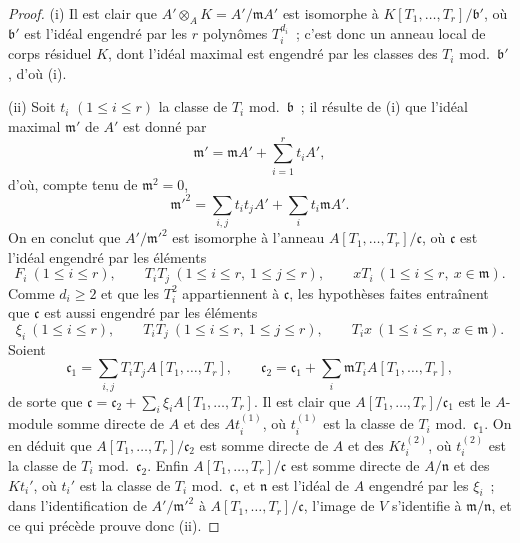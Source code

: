 \begin{proof}
(i) Il est clair que $A'\otimes_AK=A'/\mathfrak mA'$ est isomorphe à
$K[T_1,\ldots,T_r]/\mathfrak b'$, où $\mathfrak b'$ est l'idéal engendré
par les $r$ polynômes $T_i^{d_i}$~; c'est donc un anneau local de corps
résiduel $K$, dont l'idéal maximal est engendré par les classes des $T_i$
mod.~$\mathfrak b'$, d'où (i).

(ii) Soit $t_i$ $(1\leqslant i\leqslant r)$ la classe de $T_i$
mod.~$\mathfrak b$~; il résulte de (i) que l'idéal maximal $\mathfrak m'$ de
$A'$ est donné par
\[
  \mathfrak m'=\mathfrak mA'+\sum_{i=1}^r t_iA',
\]
d'où, compte tenu de $\mathfrak m^2=0$,
\[
  \mathfrak m'^2=\sum_{i,j}t_it_jA'+\sum_i t_i\mathfrak mA'.
\]
On en conclut que $A'/\mathfrak m'^2$ est isomorphe à l'anneau
$A[T_1,\ldots,T_r]/\mathfrak c$, où $\mathfrak c$ est l'idéal engendré par
les éléments
\[
  F_i\ (1\leqslant i\leqslant r),\qquad
  T_iT_j\ (1\leqslant i\leqslant r,\ 1\leqslant j\leqslant r),\qquad
  xT_i\ (1\leqslant i\leqslant r,\ x\in\mathfrak m).
\]
Comme $d_i\geqslant2$ et que les $T_i^2$ appartiennent à
$\mathfrak c$, les hypothèses faites entraînent que $\mathfrak c$ est aussi
engendré par les éléments
\[
  \xi_i\ (1\leqslant i\leqslant r),\qquad
  T_iT_j\ (1\leqslant i\leqslant r,\ 1\leqslant j\leqslant r),\qquad
  T_ix\ (1\leqslant i\leqslant r,\ x\in\mathfrak m).
\]
Soient
\[
  \mathfrak c_1=\sum_{i,j}T_iT_jA[T_1,\ldots,T_r],\qquad
  \mathfrak c_2=\mathfrak c_1+\sum_i\mathfrak mT_iA[T_1,\ldots,T_r],
\]
de sorte que
$\mathfrak c=\mathfrak c_2+\sum_i\xi_iA[T_1,\ldots,T_r]$. Il est clair que
$A[T_1,\ldots,T_r]/\mathfrak c_1$ est le $A$-module somme directe de $A$ et
des $At_i^{(1)}$, où $t_i^{(1)}$ est la classe de $T_i$
mod.~$\mathfrak c_1$. On en déduit que
$A[T_1,\ldots,T_r]/\mathfrak c_2$ est somme directe de $A$ et des
$Kt_i^{(2)}$, où $t_i^{(2)}$ est la classe de $T_i$
mod.~$\mathfrak c_2$. Enfin $A[T_1,\ldots,T_r]/\mathfrak c$ est somme
directe de $A/\mathfrak n$ et des $Kt_i'$, où $t_i'$ est la classe de $T_i$
mod.~$\mathfrak c$, et $\mathfrak n$ est l'idéal de $A$ engendré par les
$\xi_i$~; dans l'identification de $A'/\mathfrak m'^2$ à
$A[T_1,\ldots,T_r]/\mathfrak c$, l'image de $V$ s'identifie à
$\mathfrak m/\mathfrak n$, et ce qui précède prouve donc (ii).
\end{proof}

